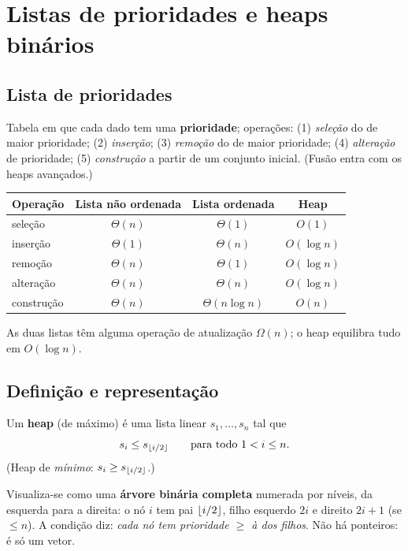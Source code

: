 \section{Listas de prioridades e heaps binários}\label{sec:heap}

\subsection{Lista de prioridades}
Tabela em que cada dado tem uma \textbf{prioridade}; operações: (1) \emph{seleção} do de maior prioridade; (2) \emph{inserção}; (3) \emph{remoção} do de maior prioridade; (4) \emph{alteração} de prioridade; (5) \emph{construção} a partir de um conjunto inicial. (Fusão entra com os heaps avançados.)

\begin{center}
\small
\begin{tabular}{@{}lccc@{}}
\toprule
Operação & Lista \textbf{não} ordenada & Lista ordenada & Heap\\
\midrule
seleção & $\Theta(n)$ & $\Theta(1)$ & $O(1)$\\
inserção & $\Theta(1)$ & $\Theta(n)$ & $O(\log n)$\\
remoção & $\Theta(n)$ & $\Theta(1)$ & $O(\log n)$\\
alteração & $\Theta(n)$ & $\Theta(n)$ & $O(\log n)$\\
construção & $\Theta(n)$ & $\Theta(n\log n)$ & $O(n)$\\
\bottomrule
\end{tabular}
\end{center}
As duas listas têm alguma operação de atualização $\Omega(n)$; o heap equilibra tudo em $O(\log n)$.

\subsection{Definição e representação}
\begin{defi}
Um \textbf{heap} (de máximo) é uma lista linear $s_1,\dots,s_n$ tal que
\[
s_i\le s_{\lfloor i/2\rfloor}\qquad\text{para todo }1<i\le n .
\]
(Heap de \emph{mínimo}: $s_i\ge s_{\lfloor i/2\rfloor}$.)
\end{defi}
Visualiza-se como uma \textbf{árvore binária completa} numerada por níveis, da esquerda para a direita: o nó $i$ tem pai $\lfloor i/2\rfloor$, filho esquerdo $2i$ e direito $2i+1$ (se $\le n$). A condição diz: \emph{cada nó tem prioridade $\ge$ à dos filhos}. Não há ponteiros: é só um vetor.

